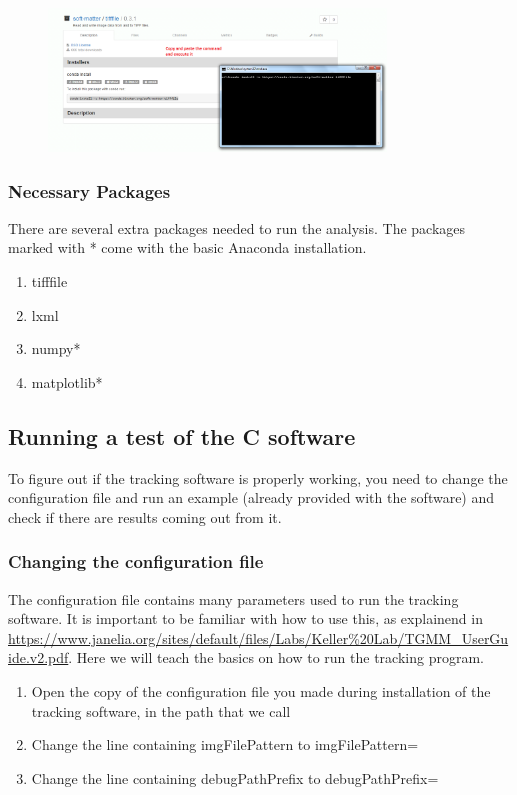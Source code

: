 \documentclass[12pt]{article}
\begin{document}
\begin{figure}[h]
\centering
\includegraphics[width=0.8\textwidth]{binstar_install.png}
\end{figure}

\subsubsection{Necessary Packages}

There are several extra packages needed to run the analysis. The packages marked with * come with the basic Anaconda installation.

\begin{enumerate}
\item{tifffile}
\item{lxml}
\item{numpy*}
\item{matplotlib*}
\end{enumerate}

\subsection{Running a test of the C software}

To figure out if the tracking software is properly working, you need to change the configuration file and run an example (already provided with the software) and check if there are results coming out from it.

\subsubsection{Changing the configuration file}

The configuration file contains many parameters used to run the tracking software. It is important to be familiar with how to use this, as explainend in \url{https://www.janelia.org/sites/default/files/Labs/Keller%20Lab/TGMM_UserGuide.v2.pdf}. Here we will teach the basics on how to run the tracking program.

\begin{enumerate}
\item{Open the copy of the configuration file you made during installation of the tracking software, in the path that we call }
\item{Change the line containing imgFilePattern to imgFilePattern=}
\item{Change the line containing debugPathPrefix to debugPathPrefix=}
\end{enumerate}
\end{document}
